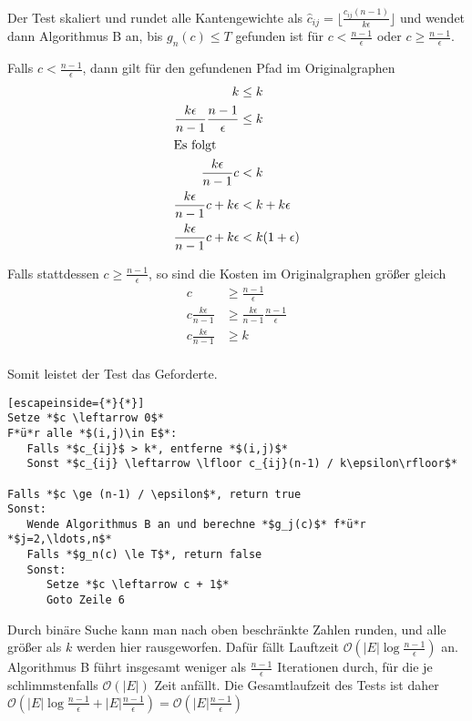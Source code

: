 \documentclass{article}
\begin{document}
Der Test skaliert und rundet alle Kantengewichte als $\hat{c}_{ij} =
\lfloor\frac{c_{ij} (n-1)}{k\epsilon}\rfloor$ und wendet dann Algorithmus B an,
bis $g_n(c) \le T$ gefunden ist für $c < \frac{n-1}{\epsilon}$ oder $c \ge
\frac{n-1}{\epsilon}$.

Falls $c < \frac{n-1}{\epsilon}$, dann gilt für den gefundenen Pfad im
Originalgraphen
\begin{align*}
   k & \le k \\
   \frac{k\epsilon}{n-1} \frac{n-1}{\epsilon} & \le k \\
   \intertext{Es folgt}
   \frac{k\epsilon}{n-1} c & < k \\
   \frac{k\epsilon}{n-1} c + k\epsilon & < k + k\epsilon\\
   \frac{k\epsilon}{n-1} c + k\epsilon & < k(1+\epsilon)\\
\end{align*}

Falls stattdessen $c \ge \frac{n-1}{\epsilon}$, so sind die Kosten im
Originalgraphen größer gleich
\begin{align*}
   c & \ge \frac{n-1}{\epsilon} \\
   c \frac{k\epsilon}{n-1} & \ge \frac{k\epsilon}{n-1}\frac{n-1}{\epsilon} \\
   c \frac{k\epsilon}{n-1} & \ge k \\
\end{align*}

Somit leistet der Test das Geforderte.
\begin{lstlisting}[escapeinside={*}{*}]
Setze *$c \leftarrow 0$*
F*ü*r alle *$(i,j)\in E$*:
   Falls *$c_{ij}$ > k*, entferne *$(i,j)$*
   Sonst *$c_{ij} \leftarrow \lfloor c_{ij}(n-1) / k\epsilon\rfloor$*

Falls *$c \ge (n-1) / \epsilon$*, return true
Sonst: 
   Wende Algorithmus B an und berechne *$g_j(c)$* f*ü*r *$j=2,\ldots,n$*
   Falls *$g_n(c) \le T$*, return false
   Sonst:
      Setze *$c \leftarrow c + 1$*
      Goto Zeile 6
\end{lstlisting}
 Durch binäre Suche kann man nach oben beschränkte Zahlen runden, und alle
 größer als $k$ werden hier rausgeworfen. Dafür fällt Lauftzeit
 $\mathcal{O}\left(|E|\log{\frac{n-1}{\epsilon}}\right)$ an. Algorithmus B führt insgesamt
 weniger als $\frac{n-1}{\epsilon}$ Iterationen durch, für die je
 schlimmstenfalls $\mathcal{O}\left(|E|\right)$ Zeit anfällt. Die Gesamtlaufzeit des Tests
 ist daher $\mathcal{O}\left(|E|\log{\frac{n-1}{\epsilon}} + |E|\frac{n-1}{\epsilon}\right)
 = \mathcal{O}\left(|E|\frac{n-1}{\epsilon}\right)
$
\end{document}
